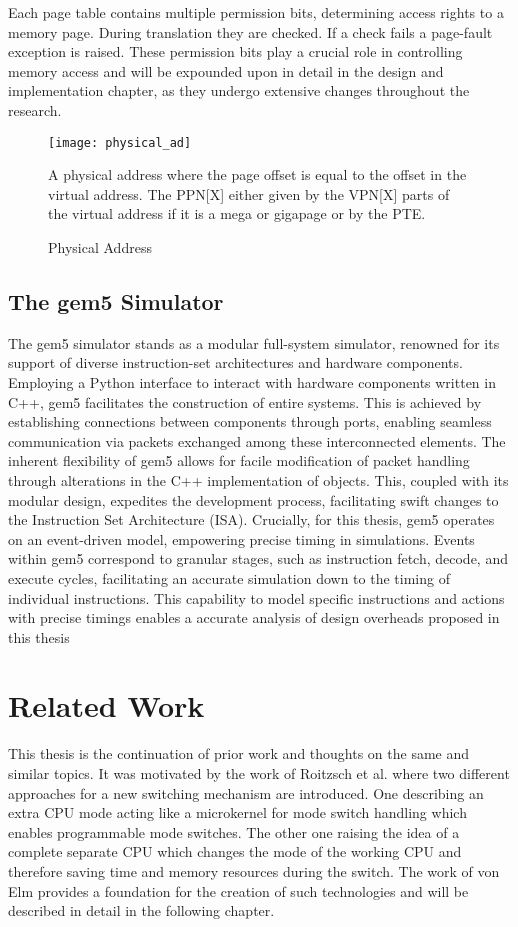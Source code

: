 Each page table contains multiple permission bits, determining access rights to
a memory page. During translation they are checked. If a check fails a
page-fault exception is raised. These permission bits play a crucial role in controlling memory
access and will be expounded upon in detail in the design and implementation
chapter, as they undergo extensive changes throughout the research.\par
\begin{figure}[h]
    \centering
    \texttt{[image: physical\_ad]}
    \caption{Physical Address}
    A physical address where the page offset is equal to the offset in the
    virtual address. The PPN[X] either given by the VPN[X] parts of the virtual
    address if it is a mega or gigapage or by the PTE.
    \label{fig:pad}
\end{figure}

\section{The gem5 Simulator}
The gem5 simulator\cite{gem5} stands as a modular full-system simulator,
renowned for its support of diverse instruction-set architectures and hardware
components. Employing a Python interface to interact with hardware components
written in C++, gem5 facilitates the construction of entire systems. This is
achieved by establishing connections between components through ports, enabling
seamless communication via packets exchanged among these interconnected
elements.
The inherent flexibility of gem5 allows for facile modification of packet
handling through alterations in the C++ implementation of objects. This, coupled
with its modular design, expedites the development process, facilitating swift
changes to the Instruction Set Architecture (ISA).
Crucially, for this thesis, gem5 operates on an event-driven model, empowering
precise timing in simulations. Events within gem5 correspond to granular stages,
such as instruction fetch, decode, and execute cycles, facilitating an accurate
simulation down to the timing of individual instructions. This capability to
model specific instructions and actions with precise timings enables a
accurate analysis of design overheads proposed in this thesis

\chapter{Related Work}

This thesis is the continuation of prior work and thoughts on the same and
similar topics. It was motivated by the work of Roitzsch et al.\cite{Roitzsch}
where two different approaches for a new switching mechanism are introduced. One
describing an extra CPU mode acting like a microkernel for mode switch handling
which enables programmable mode switches. The other one raising the idea of a
complete separate CPU which changes the mode of the working CPU and therefore
saving time and memory resources during the switch. The work of von
Elm \cite{Cve} provides a foundation for the creation of such technologies and
will be described in detail in the following chapter.

